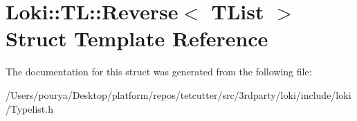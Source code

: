 \hypertarget{structLoki_1_1TL_1_1Reverse}{}\section{Loki\+:\+:T\+L\+:\+:Reverse$<$ T\+List $>$ Struct Template Reference}
\label{structLoki_1_1TL_1_1Reverse}


The documentation for this struct was generated from the following file\+:\begin{DoxyCompactItemize}
\item 
/\+Users/pourya/\+Desktop/platform/repos/tetcutter/src/3rdparty/loki/include/loki/Typelist.\+h\end{DoxyCompactItemize}
